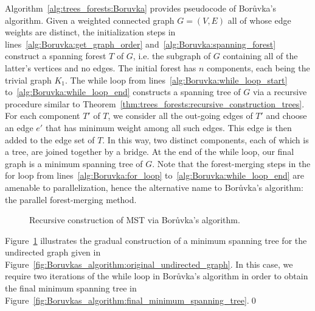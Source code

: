 Algorithm~\ref{alg:trees_forests:Boruvka} provides pseudocode of
Bor\r{u}vka's algorithm. Given a
weighted connected graph $G = (V,E)$ all of whose edge weights are
distinct, the initialization steps in
lines~\ref{alg:Boruvka:get_graph_order}
and~\ref{alg:Boruvka:spanning_forest} construct a
spanning forest $T$ of $G$, i.e. the subgraph
of $G$ containing all of the latter's vertices and no edges. The
initial forest has $n$ components, each being the
trivial graph $K_1$. The while loop from
lines~\ref{alg:Boruvka:while_loop_start}
to~\ref{alg:Boruvka:while_loop_end} constructs a spanning tree of $G$
via a recursive procedure similar to
Theorem~\ref{thm:trees_forests:recursive_construction_trees}. For each
component $T'$ of $T$, we consider all the out-going edges of $T'$ and
choose an edge $e'$ that has minimum weight
among all such edges. This edge is then added to the edge set of
$T$. In this way, two distinct components, each of which is a tree,
are joined together by a bridge. At the end of the while
loop, our final graph is a minimum
spanning tree of $G$. Note that the forest-merging steps in the for
loop from lines~\ref{alg:Boruvka:for_loop}
to~\ref{alg:Boruvka:while_loop_end} are amenable to
parallelization, hence the alternative name to
Bor\r{u}vka's algorithm: the parallel
forest-merging method.

\begin{figure}[!htbp]
\centering
{}

\caption{Recursive construction of MST via Bor\r{u}vka's algorithm.}
\label{fig:trees_forests:Boruvka_algorithm}
\end{figure}

\begin{example}
\rm
Figure~\ref{fig:trees_forests:Boruvka_algorithm} illustrates the
gradual construction of a minimum spanning tree for the undirected
graph given in
Figure~\ref{fig:Boruvkas_algorithm:original_undirected_graph}. In this
case, we require two iterations of the while loop in
Bor\r{u}vka's algorithm in order to
obtain the final minimum spanning tree in
Figure~\ref{fig:Boruvkas_algorithm:final_minimum_spanning_tree}.\qed
\end{example}

